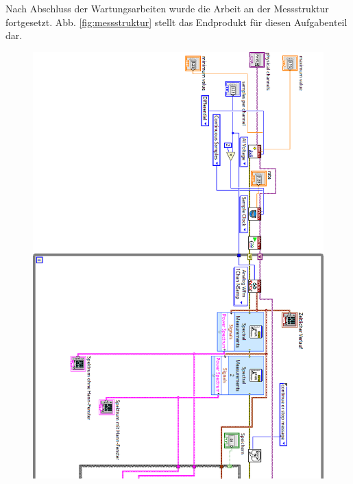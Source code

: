 
Nach Abschluss der Wartungsarbeiten wurde die Arbeit an der Messstruktur fortgesetzt.
Abb. \ref{fig:messstruktur} stellt das Endprodukt für diesen Aufgabenteil dar.
\newpage
\thispagestyle{empty}
\begin{figure}[H]
	\centering
	\includegraphics[width=\textwidth]{pic/messstruktur1.png}	
\end{figure}

